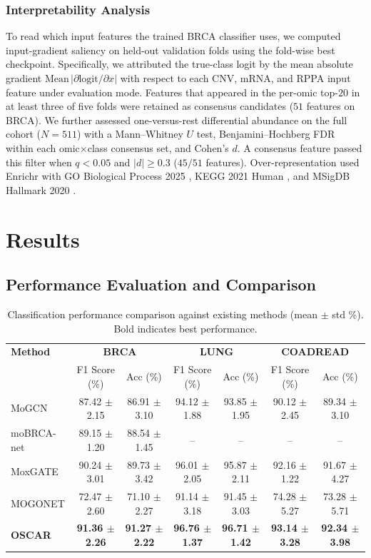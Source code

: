 \documentclass[lettersize,journal]{IEEEtran}
\begin{document}
\subsubsection{Interpretability Analysis}
To read which input features the trained BRCA classifier uses, we computed input-gradient saliency on held-out validation folds using the fold-wise best checkpoint.
Specifically, we attributed the true-class logit by the mean absolute gradient $\mathrm{Mean}\,|\partial\mathrm{logit}/\partial x|$ with respect to each CNV, mRNA, and RPPA input feature under evaluation mode.
Features that appeared in the per-omic top-$20$ in at least three of five folds were retained as consensus candidates ($51$ features on BRCA).
We further assessed one-versus-rest differential abundance on the full cohort ($N=511$) with a Mann--Whitney $U$ test, Benjamini--Hochberg FDR \cite{Benjamini1995FDR} within each omic$\times$class consensus set, and Cohen's $d$.
A consensus feature passed this filter when $q<0.05$ and $|d|\ge 0.3$ ($45/51$ features).
Over-representation used Enrichr \cite{Kuleshov2016Enrichr} with GO Biological Process 2025 \cite{Ashburner2000GO}, KEGG 2021 Human \cite{Kanehisa2000KEGG}, and MSigDB Hallmark 2020 \cite{Liberzon2015Hallmark}.

\section{Results}
\subsection{Performance Evaluation and Comparison}

\begin{table}[htbp]
\centering
\small
\caption{Classification performance comparison against existing methods (mean $\pm$ std \%). Bold indicates best performance.}
\label{tab:results}
\begin{tabular}{l|cc|cc|cc}
\hline
\textbf{Method} & \multicolumn{2}{c|}{\textbf{BRCA}} & \multicolumn{2}{c|}{\textbf{LUNG}} & \multicolumn{2}{c}{\textbf{COADREAD}} \\
 & F1 Score (\%) & Acc (\%) & F1 Score (\%) & Acc (\%) & F1 Score (\%) & Acc (\%) \\ \hline
MoGCN \cite{MoGCN2022} & 87.42 $\pm$ 2.15 & 86.91 $\pm$ 3.10 & 94.12 $\pm$ 1.88 & 93.85 $\pm$ 1.95 & 90.12 $\pm$ 2.45 & 89.34 $\pm$ 3.10 \\
moBRCA-net \cite{moBRCAnat2023} & 89.15 $\pm$ 1.20 & 88.54 $\pm$ 1.45 & -- & -- & -- & -- \\
MoxGATE \cite{MoxGATE2023} & 90.24 $\pm$ 3.01 & 89.73 $\pm$ 3.42 & 96.01 $\pm$ 2.05 & 95.87 $\pm$ 2.11 & 92.16 $\pm$ 1.22 & 91.67 $\pm$ 4.27 \\ 
MOGONET \cite{MOGONET2021} & 72.47 $\pm$ 2.60 & 71.10 $\pm$ 2.27 & 91.14 $\pm$ 3.18 & 91.45 $\pm$ 3.03 & 74.28 $\pm$ 5.27 & 73.28 $\pm$ 5.71 \\ \hline
\textbf{OSCAR} & \textbf{91.36 $\pm$ 2.26} & \textbf{91.27 $\pm$ 2.22} & \textbf{96.76 $\pm$ 1.37} & \textbf{96.71 $\pm$ 1.42} & \textbf{93.14 $\pm$ 3.28} & \textbf{92.34 $\pm$ 3.98} \\ \hline
\end{tabular}
\end{table}
\end{document}
